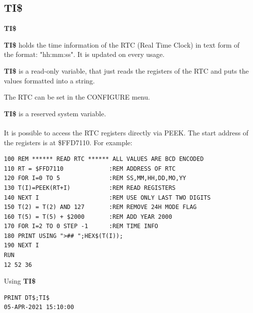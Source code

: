 \subsection{TI\$}
\begin{description}[leftmargin=2cm,style=nextline]
\item [Format:] {\bf TI\$}
\item [Usage:]  {\bf TI\$} holds the time information of the RTC
                (Real Time Clock)
                in text form of the format:
                "hh:mm:ss".
                It is updated on every usage.

                {\bf TI\$} is a read-only variable, that just
                reads the registers of the RTC and puts the values
                formatted into a string.

                The RTC can be set in the CONFIGURE menu.

\item [Remarks:]
                {\bf TI\$} is a reserved system variable.\\
                \\
                It is possible to access the RTC registers directly
                via PEEK. The start address of the registers is at
                \$FFD7110. For example:

\begin{tcolorbox}[colback=black,coltext=white]
\verbatimfont{\codefont}
\begin{verbatim}
100 REM ****** READ RTC ****** ALL VALUES ARE BCD ENCODED
110 RT = $FFD7110             :REM ADDRESS OF RTC
120 FOR I=0 TO 5              :REM SS,MM,HH,DD,MO,YY
130 T(I)=PEEK(RT+I)           :REM READ REGISTERS
140 NEXT I                    :REM USE ONLY LAST TWO DIGITS
150 T(2) = T(2) AND 127       :REM REMOVE 24H MODE FLAG
160 T(5) = T(5) + $2000       :REM ADD YEAR 2000
170 FOR I=2 TO 0 STEP -1      :REM TIME INFO
180 PRINT USING ">## ";HEX$(T(I));
190 NEXT I
RUN
12 52 36
\end{verbatim}
\end{tcolorbox}

\item [Example:] Using {\bf TI\$}
\begin{tcolorbox}[colback=black,coltext=white]
\verbatimfont{\codefont}
\begin{verbatim}
PRINT DT$;TI$
05-APR-2021 15:10:00
\end{verbatim}
\end{tcolorbox}
\end{description}

